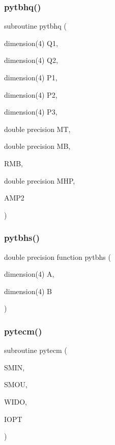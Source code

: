 \subsubsection{\texorpdfstring{pytbhq()}{pytbhq()}}
{\footnotesize\ttfamily subroutine pytbhq (\begin{DoxyParamCaption}\item[{dimension(4)}]{Q1,  }\item[{dimension(4)}]{Q2,  }\item[{dimension(4)}]{P1,  }\item[{dimension(4)}]{P2,  }\item[{dimension(4)}]{P3,  }\item[{double precision}]{MT,  }\item[{double precision}]{MB,  }\item[{}]{R\+MB,  }\item[{double precision}]{M\+HP,  }\item[{}]{A\+M\+P2 }\end{DoxyParamCaption})}

\mbox{\label{pythia-6_84_824_8f_a3fdb9651ba9fba9a91b74a416c48747b}} 
\subsubsection{\texorpdfstring{pytbhs()}{pytbhs()}}
{\footnotesize\ttfamily double precision function pytbhs (\begin{DoxyParamCaption}\item[{dimension(4)}]{A,  }\item[{dimension(4)}]{B }\end{DoxyParamCaption})}

\mbox{\label{pythia-6_84_824_8f_a704cb09d423c8653c6bdd905afbaa35f}} 
\subsubsection{\texorpdfstring{pytecm()}{pytecm()}}
{\footnotesize\ttfamily subroutine pytecm (\begin{DoxyParamCaption}\item[{}]{S\+M\+IN,  }\item[{}]{S\+M\+OU,  }\item[{}]{W\+I\+DO,  }\item[{}]{I\+O\+PT }\end{DoxyParamCaption})}

